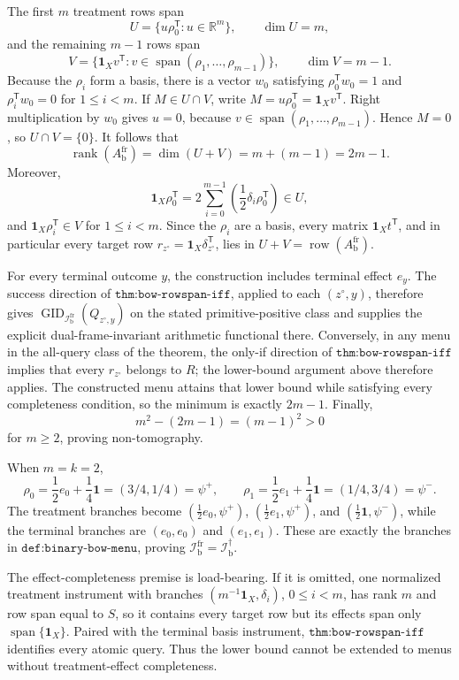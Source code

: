 The first \(m\) treatment rows span
\[
U=\{u\rho_0^{\mathsf T}:u\in\mathbb R^m\},
\qquad \dim U=m,
\]
and the remaining \(m-1\) rows span
\[
V=\{\mathbf 1_Xv^{\mathsf T}:v\in\operatorname{span}(\rho_1,\ldots,\rho_{m-1})\},
\qquad \dim V=m-1.
\]
Because the \(\rho_i\) form a basis, there is a vector \(w_0\) satisfying \(\rho_0^{\mathsf T}w_0=1\) and \(\rho_i^{\mathsf T}w_0=0\) for \(1\le i<m\).  If \(M\in U\cap V\), write \(M=u\rho_0^{\mathsf T}=\mathbf 1_Xv^{\mathsf T}\).  Right multiplication by \(w_0\) gives \(u=0\), because \(v\in\operatorname{span}(\rho_1,\ldots,\rho_{m-1})\).  Hence \(M=0\), so \(U\cap V=\{0\}\).  It follows that
\[
\operatorname{rank}(A_{\mathrm b}^{\mathrm{fr}})
=\dim(U+V)=m+(m-1)=2m-1.
\]
Moreover,
\[
\mathbf 1_X\rho_0^{\mathsf T}
=2\sum_{i=0}^{m-1}\left(\frac12\delta_i\rho_0^{\mathsf T}\right)\in U,
\]
and \(\mathbf 1_X\rho_i^{\mathsf T}\in V\) for \(1\le i<m\).  Since the \(\rho_i\) are a basis, every matrix \(\mathbf 1_Xt^{\mathsf T}\), and in particular every target row \(r_{z^{\circ}}=\mathbf 1_X\delta_{z^{\circ}}^{\mathsf T}\), lies in \(U+V=\operatorname{row}(A_{\mathrm b}^{\mathrm{fr}})\).

For every terminal outcome \(y\), the construction includes terminal effect \(e_y\).  The success direction of \(\texttt{thm:bow-rowspan-iff}\), applied to each \((z^{\circ},y)\), therefore gives \(\operatorname{GID}_{\mathcal I_{\mathrm b}^{\mathrm{fr}}}(Q_{z^{\circ},y})\) on the stated primitive-positive class and supplies the explicit dual-frame-invariant arithmetic functional there.  Conversely, in any menu in the all-query class of the theorem, the only-if direction of \(\texttt{thm:bow-rowspan-iff}\) implies that every \(r_{z^{\circ}}\) belongs to \(R\); the lower-bound argument above therefore applies.  The constructed menu attains that lower bound while satisfying every completeness condition, so the minimum is exactly \(2m-1\).  Finally,
\[
m^2-(2m-1)=(m-1)^2>0
\]
for \(m\ge2\), proving non-tomography.

When \(m=k=2\),
\[
\rho_0=\frac12e_0+\frac14\mathbf 1=(3/4,1/4)=\psi^+,
\qquad
\rho_1=\frac12e_1+\frac14\mathbf 1=(1/4,3/4)=\psi^-.
\]
The treatment branches become \((\tfrac12e_0,\psi^+)\), \((\tfrac12e_1,\psi^+)\), and \((\tfrac12\mathbf 1,\psi^-)\), while the terminal branches are \((e_0,e_0)\) and \((e_1,e_1)\).  These are exactly the branches in \(\texttt{def:binary-bow-menu}\), proving \(\mathcal I_{\mathrm b}^{\mathrm{fr}}=\mathcal I_{\mathrm b}^{\dagger}\).

The effect-completeness premise is load-bearing.  If it is omitted, one normalized treatment instrument with branches \((m^{-1}\mathbf 1_X,\delta_i)\), \(0\le i<m\), has rank \(m\) and row span equal to \(S\), so it contains every target row but its effects span only \(\operatorname{span}\{\mathbf 1_X\}\).  Paired with the terminal basis instrument, \(\texttt{thm:bow-rowspan-iff}\) identifies every atomic query.  Thus the lower bound cannot be extended to menus without treatment-effect completeness.